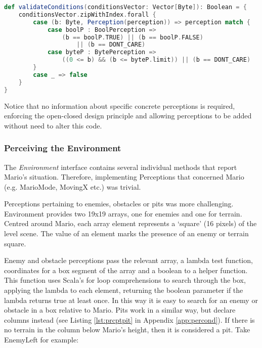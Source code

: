 \begin{minipage}{0.9\linewidth}
\centering
\begin{lstlisting}[language=scala]
def validateConditions(conditionsVector: Vector[Byte]): Boolean = {
    conditionsVector.zipWithIndex.forall {
        case (b: Byte, Perception(perception)) => perception match {
            case boolP : BoolPerception => 
                (b == boolP.TRUE) || (b == boolP.FALSE) 
                    || (b == DONT_CARE)
            case byteP : BytePerception => 
                ((0 <= b) && (b <= byteP.limit)) || (b == DONT_CARE)
        }
        case _ => false 
    }
}

\end{lstlisting}
\end{minipage}

Notice that no information about specific concrete perceptions is required, enforcing the open-closed design principle and allowing perceptions to be added without need to alter this code.

\subsubsection{Perceiving the Environment}

The \emph{Environment} interface contains several individual methods that report Mario's situation. Therefore, implementing Perceptions that concerned Mario (e.g. MarioMode, MovingX etc.) was trivial.

Perceptions pertaining to enemies, obstacles or pits was more challenging. Environment provides two 19x19 arrays, one for enemies and one for terrain. Centred around Mario, each array element represents a `square' (16 pixels) of the level scene. The value of an element marks the presence of an enemy or terrain square. 

Enemy and obstacle perceptions pass the relevant array, a lambda test function, coordinates for a box segment of the array and a boolean to a helper function. This function uses Scala's for loop comprehensions to search through the box, applying the lambda to each element, returning the boolean parameter if the lambda returns true at least once. In this way it is easy to search for an enemy or obstacle in a box relative to Mario. Pits work in a similar way, but declare columns instead (see Listing \ref{lst:prcptpit} in Appendix \ref{app:percond}). If there is no terrain in the column below Mario's height, then it is considered a pit. Take EnemyLeft for example:

